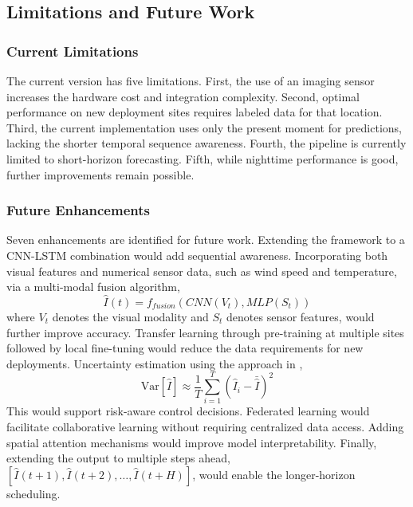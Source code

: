 \documentclass[journal]{IEEEtran}
\begin{document}
\subsection{Limitations and Future Work}

\subsubsection{Current Limitations}
The current version has five limitations. First, the use of an imaging sensor increases the hardware cost and integration complexity. Second, optimal performance on new deployment sites requires labeled data for that location. Third, the current implementation uses only the present moment for predictions, lacking the shorter temporal sequence awareness. Fourth, the pipeline is currently limited to short-horizon forecasting. Fifth, while nighttime performance is good, further improvements remain possible.

\subsubsection{Future Enhancements}
Seven enhancements are identified for future work. Extending the framework to a CNN-LSTM combination would add sequential awareness. Incorporating both visual features and numerical sensor data, such as wind speed and temperature, via a multi-modal fusion algorithm,
\begin{equation}
\hat{I}(t) = f_{fusion}(CNN(V_t), MLP(S_t))
\end{equation}
where $V_t$ denotes the visual modality and $S_t$ denotes sensor features, would further improve accuracy. Transfer learning through pre-training at multiple sites followed by local fine-tuning would reduce the data requirements for new deployments. Uncertainty estimation using the approach in \cite{ref13},
\begin{equation}
\text{Var}[\hat{I}] \approx \frac{1}{T}\sum_{i=1}^{T} (\hat{I}_i - \bar{\hat{I}})^2
\end{equation}
This would support risk-aware control decisions. Federated learning would facilitate collaborative learning without requiring centralized data access. Adding spatial attention mechanisms would improve model interpretability. Finally, extending the output to multiple steps ahead, $[\hat{I}(t+1), \hat{I}(t+2), \ldots, \hat{I}(t+H)]$, would enable the longer-horizon scheduling.
\end{document}
